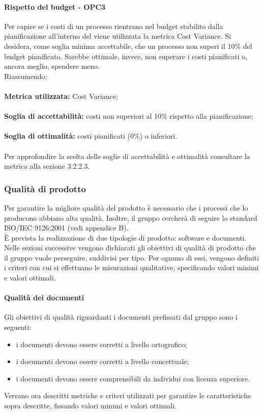 \documentclass[PianoDiQualifica.tex]{subfiles}
\begin{document}
			\paragraph{Rispetto del budget - OPC3}
			Per capire se i costi di un processo rientrano nel budget stabilito dalla pianificazione all'interno del \PPdocRR{} viene utilizzata la metrica Cost Variance.
			Si desidera, come soglia minima accettabile, che un processo non superi il 10\% del budget pianificato. Sarebbe ottimale, invece, non superare i costi pianificati o, ancora meglio,
			spendere meno.\\
			Riassumendo: \\ \\
			\textbf{Metrica utilizzata:} Cost Variance; \\ \\
			\textbf{Soglia di accettabilità:} costi non superiori al 10\% rispetto alla pianificazione; \\ \\
			\textbf{Soglia di ottimalità:}  costi pianificati (0\%) o inferiori. \\ \\
			Per approfondire la scelta delle soglie di accettabilità e ottimalità consultare la metrica alla sezione 3.2.2.3.
			
		\subsubsection{Qualità di prodotto}
		Per garantire la migliore qualità del prodotto è necessario che i processi che lo producono abbiano alta qualità.
		Inoltre, il gruppo \GRUPPO{} cercherà di seguire lo standard ISO/IEC 9126:2001 (vedi appendice B). \\
		È prevista la realizzazione di due tipologie di prodotto: software e documenti.
		Nelle sezioni successive vengono dichiarati gli obiettivi di qualità di prodotto che il gruppo vuole perseguire, suddivisi per tipo.
		Per ognuno di essi, vengono definiti i criteri con cui si effettuano le misurazioni qualitative, specificando valori minimi e valori ottimali.
		
			\paragraph{Qualità dei documenti}
			Gli obiettivi di qualità riguardanti i documenti prefissati dal gruppo \GRUPPO{} sono i seguenti:
			\begin{itemize}
				\item i documenti devono essere corretti a livello ortografico;
				\item i documenti devono essere corretti a livello concettuale;
				\item i documenti devono essere comprensibili da individui con licenza superiore.
			\end{itemize}
			Verrano ora descritti metriche e criteri utilizzati per garantire le caratteristiche sopra descritte, fissando valori minimi e valori ottimali.
			
\end{document}
